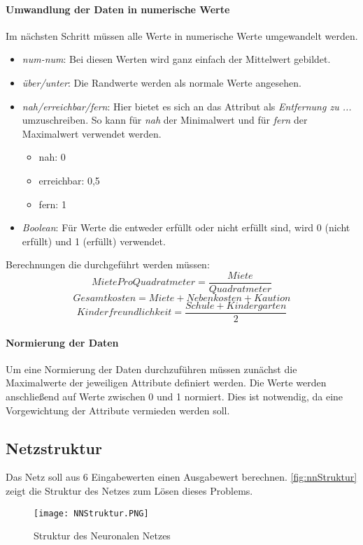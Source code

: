 \paragraph{Umwandlung der Daten in numerische Werte}
Im nächsten Schritt müssen alle Werte in numerische Werte umgewandelt werden.
\begin{itemize}
    \item \textit{num-num}: Bei diesen Werten wird ganz einfach der Mittelwert gebildet.
    \item \textit{über/unter}: Die Randwerte werden als normale Werte angesehen.
    \item \textit{nah/erreichbar/fern}: Hier bietet es sich an das Attribut als \textit{Entfernung zu ...} umzuschreiben.
                So kann für \textit{nah} der Minimalwert und für \textit{fern} der Maximalwert verwendet werden.
    \begin{itemize}
        \item nah: 0
        \item erreichbar: 0,5
        \item fern: 1
    \end{itemize}
    \item \textit{Boolean}: Für Werte die entweder erfüllt oder nicht erfüllt sind, wird 0 (nicht erfüllt) und 1 (erfüllt) verwendet.
\end{itemize}

Berechnungen die durchgeführt werden müssen:
\begin{equation}
        MieteProQuadratmeter = \frac{Miete}{Quadratmeter}
\end{equation}
\begin{equation}
    Gesamtkosten = Miete + Nebenkosten + Kaution
\end{equation}
\begin{equation}
    Kinderfreundlichkeit = \frac{Schule + Kindergarten}{2}
\end{equation}

\paragraph{Normierung der Daten}
Um eine Normierung der Daten durchzuführen müssen zunächst die Maximalwerte der
jeweiligen Attribute definiert werden. Die Werte werden anschließend auf Werte
zwischen 0 und 1 normiert. Dies ist notwendig, da eine Vorgewichtung der Attribute
vermieden werden soll.

\subsection{Netzstruktur}
Das Netz soll aus $6$ Eingabewerten einen Ausgabewert berechnen.
\autoref{fig:nnStruktur} zeigt die Struktur des Netzes zum Lösen
dieses Problems.
\begin{figure}[ht]
    \centering
    \texttt{[image: NNStruktur.PNG]}
    \caption{Struktur des Neuronalen Netzes}
    \label{fig:nnStruktur}
\end{figure}

